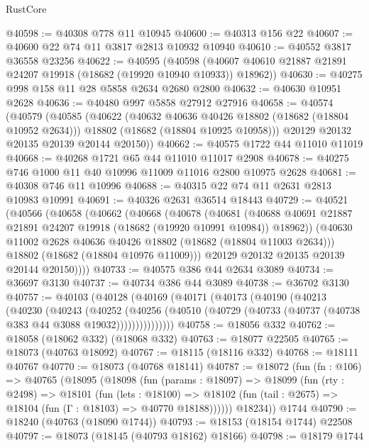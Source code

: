 \begin{lexlean}{RustCore}
\begin{coremodule}
@40598 := @40308 @778 @11 @10945
@40600 := @40313 @156 @22
@40607 := @40600 @22 @74 @11 @3817 @2813 @10932 @10940
@40610 := @40552 @3817 @36558 @23256
@40622 := @40595
    (@40598 (@40607 @40610 @21887 @21891 @24207 @19918 (@18682 (@19920 @10940 @10933)) @18962))
@40630 := @40275 @998 @158 @11 @28 @5858 @2634 @2680 @2800
@40632 := @40630 @10951 @2628
@40636 := @40480 @997 @5858 @27912 @27916
@40658 := @40574
    (@40579
      (@40585
        (@40622
          (@40632 @40636 @40426 @18802 (@18682 (@18804 @10952 @2634)))
          @18802
          (@18682 (@18804 @10925 @10958)))
        @20129
        @20132
        @20135
        @20139
        @20144
        @20150))
@40662 := @40575 @1722 @44 @11010 @11019
@40668 := @40268 @1721 @65 @44 @11010 @11017 @2908
@40678 := @40275 @746 @1000 @11 @40 @10996 @11009 @11016 @2800 @10975 @2628
@40681 := @40308 @746 @11 @10996
@40688 := @40315 @22 @74 @11 @2631 @2813 @10983 @10991
@40691 := @40326 @2631 @36514 @18443
@40729 := @40521
    (@40566
      (@40658
        (@40662
          (@40668
            (@40678
              (@40681
                (@40688 @40691 @21887 @21891 @24207 @19918 (@18682 (@19920 @10991 @10984)) @18962))
              (@40630 @11002 @2628 @40636 @40426 @18802 (@18682 (@18804 @11003 @2634)))
              @18802
              (@18682 (@18804 @10976 @11009)))
            @20129
            @20132
            @20135
            @20139
            @20144
            @20150))))
@40733 := @40575 @386 @44 @2634 @3089
@40734 := @36697 @3130
@40737 := @40734 @386 @44 @3089
@40738 := @36702 @3130
@40757 := @40103
    (@40128
      (@40169
        (@40171
          (@40173
            (@40190
              (@40213
                (@40230
                  (@40243
                    (@40252
                      (@40256
                        (@40510 (@40729 (@40733 (@40737 (@40738 @383 @44 @3088 @19032)))))))))))))))
@40758 := @18056 @332
@40762 := @18058 (@18062 @332) (@18068 @332)
@40763 := @18077 @22505
@40765 := @18073 (@40763 @18092)
@40767 := @18115 (@18116 @332)
@40768 := @18111 @40767
@40770 := @18073 (@40768 @18141)
@40787 := @18072
    (fun (fn : @106) =>
    @40765
      (@18095
        (@18098
          (fun (params : @18097) =>
          @18099
            (fun (rty : @2498) =>
            @18101
              (fun (lets : @18100) =>
              @18102 (fun (tail : @2675) => @18104 (fun (Γ : @18103) => @40770 @18188))))))
        @18234))
    @1744
@40790 := @18240 (@40763 (@18090 @1744))
@40793 := @18153 (@18154 @1744) @22508
@40797 := @18073 (@18145 (@40793 @18162) @18166)
@40798 := @18179 @1744

\end{coremodule}
\end{lexlean}
